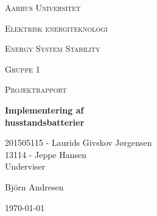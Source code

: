 \thispagestyle{empty}
	{\centering
	{\scshape\LARGE Aarhus Universitet \par}
	\vspace{1cm}
	{\scshape\Large Elektrisk energiteknologi\par}
	\vspace{0.5cm}
	{\scshape\Large Energy System Stability\par}
	{\scshape\Large Gruppe 1\par}
	{\scshape\Large Projektrapport\par}
	\vspace{1.5cm}
	{\huge\bfseries Implementering af\\ husstandsbatterier\par}
	\vspace{2cm}
	{\Large
	201505115 - Laurids Givskov Jørgensen\\
	13114 - Jeppe Hansen\\   }
	\vfill
	Underviser\par
	Björn Andresen

	\vfill

	{\large \today\par}
\par}